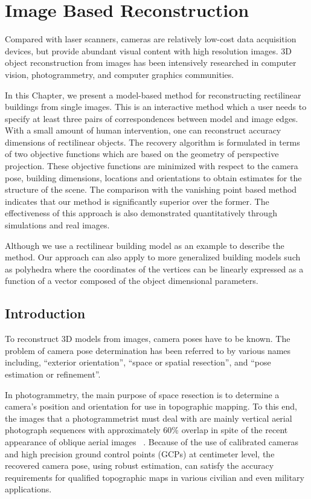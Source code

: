 \chapter{Image Based Reconstruction}

Compared with laser scanners, cameras are relatively low-cost data acquisition devices, but provide abundant visual content with high resolution images. 3D object reconstruction from images has been intensively researched in computer vision, photogrammetry, and computer graphics communities.

In this Chapter, we present a model-based method for reconstructing rectilinear buildings from single images. This is an interactive method which a user needs to
specify at least three pairs of correspondences between model and image edges.
With a small amount of human intervention, one can reconstruct accuracy dimensions of rectilinear objects. The recovery algorithm is formulated in terms of two objective functions which are based on the
geometry of perspective projection. These objective functions are minimized with respect to the camera pose, building dimensions, locations and orientations to obtain estimates for the structure of the scene. The comparison with the vanishing point based method indicates that our method is significantly superior over the former. The effectiveness of this approach is also demonstrated quantitatively through simulations and real images. 

Although we use a rectilinear building model as an example to describe the method. Our approach can also apply to more generalized building models such as polyhedra where the coordinates of the vertices can be linearly expressed as a function of a vector composed of the object dimensional parameters. 

\section{Introduction}

To reconstruct 3D models from images, camera poses have to be known. The problem of camera pose determination has been referred to by various names including, ``exterior orientation'', ``space or spatial resection'', and ``pose estimation or refinement''. 

In photogrammetry, the main purpose of space resection is to determine a camera’s position and orientation for use in topographic mapping. To this end, the images that a photogrammetrist must deal with are mainly vertical aerial photograph sequences with approximately 60\% overlap in spite of the recent appearance of oblique aerial images ~\cite{pictometry-url}. Because of the use of calibrated cameras and high precision ground control points (GCPs) at centimeter level, the recovered camera pose, using robust estimation, can satisfy the accuracy requirements for qualified topographic maps in various civilian and even military applications. 

